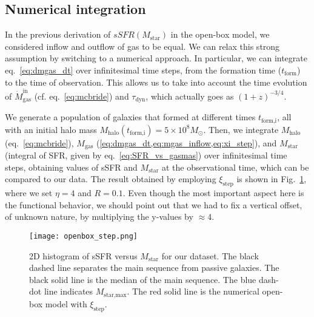 \documentclass[fleqn,usenatbib]{mnras}
\begin{document}
\subsection{Numerical integration}\label{sec:numerical_integration}
In the previous derivation of $sSFR\left(M_{\text{star}}\right)$ in the open-box model, we considered inflow and outflow of gas to be equal. We can relax this strong assumption by switching to a numerical approach. In particular, we can integrate eq.~\ref{eq:dmgas_dt} over infinitesimal time steps, from the formation time ($t_\text{form}$) to the time of observation. This allows us to take into account the time evolution of $\dot{M}_\text{gas}^\text{in}$ (cf. eq.~\ref{eq:mcbride}) and $\tau_\text{dyn}$, which actually goes as {\small$(1+z)^{-3/4}$}. 

We generate a population of galaxies that formed at different times $t_\text{form,i}$, all with an initial halo mass $M_\text{halo}(t_\text{form,i})=5 \times 10^8 M_\odot$. Then, we integrate $M_\text{halo}$ (eq.~\ref{eq:mcbride}), $M_\text{gas}$ (\cref{eq:dmgas_dt,eq:mgas_inflow,eq:xi_step}), and $M_\text{star}$ (integral of SFR, given by eq.~\ref{eq:SFR_vs_gasmas}) over infinitesimal time steps, obtaining values of sSFR and $M_\text{star}$ at the observational time, which can be compared to our data. The result obtained by employing $\xi_\text{step}$ is shown in Fig.~\ref{fig:openbox_step}, where we set $\eta=4$ and $R=0.1$. Even though the most important aspect here is the functional behavior, we should point out that we had to fix a vertical offset, of unknown nature, by multiplying the y-values by $\approx4$.  

\begin{figure}\centering
	\texttt{[image: openbox\_step.png]}
    \caption{2D histogram of sSFR versus $M_\text{star}$ for our dataset. The black dashed line separates the main sequence from passive galaxies. The black solid line is the median of the main sequence. The blue dash-dot line indicates $M_\text{star,max}$. The red solid line is the numerical open-box model with $\xi_\text{step}$.}
    \label{fig:openbox_step}
\end{figure}
\end{document}
